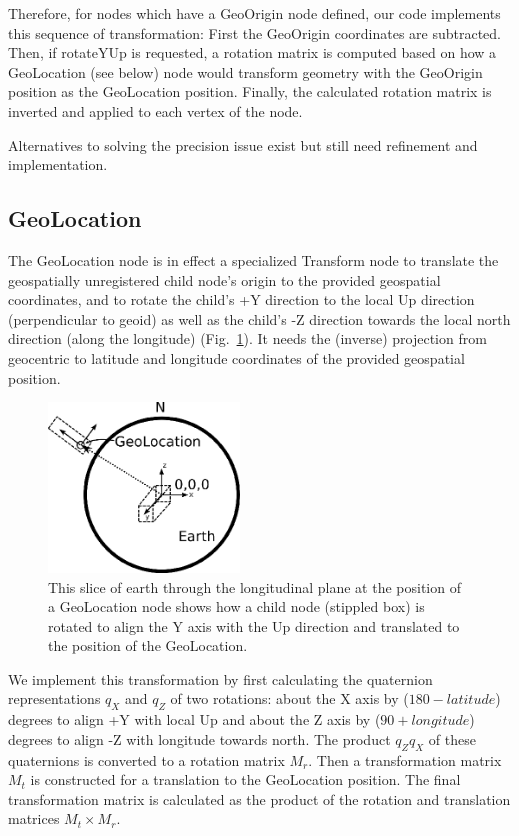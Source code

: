 \documentclass[review]{acmsiggraph}            %
\begin{document}
Therefore, for nodes which have a GeoOrigin node defined, our code implements this sequence of
transformation: First the GeoOrigin coordinates are subtracted. Then, if rotateYUp is requested, a
rotation matrix is computed based on how a GeoLocation (see below) node would transform geometry
with the GeoOrigin position as the GeoLocation position. Finally, the calculated rotation matrix is
inverted and applied to each vertex of the node.

Alternatives to solving the precision issue exist \cite{mccann09} but still
need refinement and implementation.


\subsection{GeoLocation}

The GeoLocation node is in effect a specialized Transform node to translate the geospatially
unregistered child node's origin to the provided geospatial coordinates, and to rotate the child's
+Y direction to the local Up direction (perpendicular to geoid) as well as the child's -Z direction
towards the local north direction (along the longitude) (Fig.~\ref{fig:GeoLocationDiagram}). It
needs the (inverse) projection from geocentric to latitude and longitude coordinates of the provided
geospatial position.

\begin{figure}[htbp] \centering \includegraphics[width=2.0in]{GeoLocationDiagram.png} \caption{This
  slice of earth through the longitudinal plane at the position of a GeoLocation node shows how a
child node (stippled box) is rotated to align the Y axis with the Up direction and translated to the
position of the GeoLocation.} \label{fig:GeoLocationDiagram} \end{figure}

We implement this transformation by first calculating the quaternion representations $q_X$ and $q_Z$
of two rotations: about the X axis by ($180 - latitude$) degrees to align +Y with local Up and about
the Z axis by ($90 + longitude$) degrees to align -Z with longitude towards north. The product
$q_{Z}q_{X}$ of these quaternions is converted to a rotation matrix $M_r$. Then a transformation
matrix $M_t$ is constructed for a translation to the GeoLocation position. The final transformation
matrix is calculated as the product of the rotation and translation matrices $M_t \times M_r$.
\end{document}
